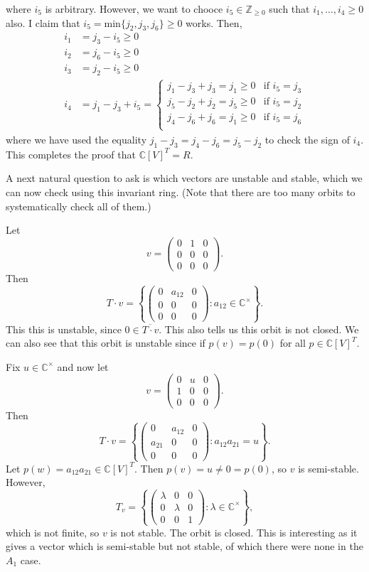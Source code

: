 \documentclass[12pt]{amsart}
\newcommand{\C}{\mathbb{C}}
\theoremstyle{remark}
\theoremstyle{remark}
\begin{document}
where $i_5$ is arbitrary.
However, we want to chooce $i_5 \in \mathbb{Z}_{\ge 0}$ such that $i_1, \ldots, i_4 \ge 0$ also.
I claim that $i_5 = \mathrm{min}\{j_2, j_3, j_6\} \ge 0$ works.
Then,
\begin{align*}
	i_1 &= j_3 - i_5 \ge 0 \\
	i_2 &= j_6 - i_5 \ge 0 \\
	i_3 &= j_2 - i_5 \ge 0 \\
	i_4 
	&= j_1 - j_3 + i_5
	= \begin{cases}
				j_1 - j_3 + j_3 = j_1 \ge 0 & \text{if } i_5 = j_3 \\
				j_5 - j_2 + j_2 = j_5 \ge 0 & \text{if } i_5 = j_2 \\
				j_4 - j_6 + j_6 = j_1 \ge 0 & \text{if } i_5 = j_6 \\
		\end{cases}
\end{align*}
where we have used the equality $j_1 - j_3 = j_4 - j_6 = j_5 - j_2$ to check the sign of $i_4$.
This completes the proof that $\C[V]^T = R$.

A next natural question to ask is which vectors are unstable and stable, which we can now check using this invariant ring.
(Note that there are too many orbits to systematically check all of them.)

Let 
$$v = \begin{pmatrix} 0 & 1 & 0 \\ 0 & 0 & 0 \\ 0 & 0 & 0 \end{pmatrix}.$$
Then
$$T \cdot v
= \left\{
\begin{pmatrix} 0 & a_{12} & 0 \\ 0 & 0 & 0 \\ 0 & 0 & 0 \end{pmatrix} : a_{12} \in \C^\times
\right\}.$$
This this is unstable, since $0 \in \overline{T \cdot v}$.
This also tells us this orbit is not closed.
We can also see that this orbit is unstable since if $p(v) = p(0)$ for all $p \in \C[V]^T$.

Fix $u \in \C^\times$ and now let
$$v = \begin{pmatrix} 0 & u & 0 \\ 1 & 0 & 0 \\ 0 & 0 & 0 \end{pmatrix}.$$
Then
$$T \cdot v 
= \left\{
\begin{pmatrix} 0 & a_{12} & 0 \\ a_{21} & 0 & 0 \\ 0 & 0 & 0 \end{pmatrix} : a_{12} a_{21} = u
\right\}.$$
Let $p(w) = a_{12} a_{21} \in \C[V]^T$.
Then $p(v) = u \ne 0 = p(0)$, so $v$ is semi-stable.
However,
$$T_v = \left\{
\begin{pmatrix} \lambda & 0 & 0 \\ 0 & \lambda & 0 \\ 0 & 0 & 1 \end{pmatrix} : \lambda \in \C^\times
\right\},$$
which is not finite, so $v$ is not stable.
The orbit is closed.
This is interesting as it gives a vector which is semi-stable but not stable, of which there were none in the $A_1$ case.
\end{document}

